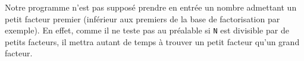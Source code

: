 \begin{remarque}
	Notre programme n'est pas supposé prendre en entrée un nombre admettant un
	petit facteur premier (inférieur aux premiers de la base de factorisation
	par exemple).  En effet, comme il ne teste pas au préalable si \texttt{N}
	est divisible par de petits facteurs, il mettra autant de temps à trouver
	un petit facteur qu'un grand facteur.
\end{remarque}
